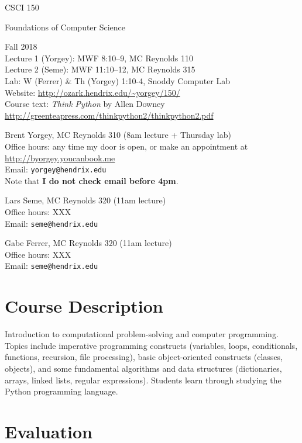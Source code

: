 \documentclass{article}
\begin{document}
{\Large
\noindent CSCI 150 \smallskip

\noindent Foundations of Computer Science \bigskip
}

\noindent Fall 2018 \\
Lecture 1 (Yorgey): MWF 8:10--9, MC Reynolds 110\\
Lecture 2 (Seme): MWF 11:10--12, MC Reynolds 315\\
Lab: W (Ferrer) \& Th (Yorgey) 1:10-4, Snoddy Computer Lab\\
Website: \url{http://ozark.hendrix.edu/~yorgey/150/} \\
Course text: \emph{Think Python} by Allen Downey \\
\indent \url{http://greenteapress.com/thinkpython2/thinkpython2.pdf}
\medskip

\noindent Brent Yorgey, MC Reynolds 310 (8am lecture + Thursday lab)\\
Office hours: any time my door is open, or make an appointment at \\
\indent \url{http://byorgey.youcanbook.me} \\
Email: \texttt{yorgey@hendrix.edu} \\
Note that \textbf{I do not check email before 4pm}.\medskip

\noindent Lars Seme, MC Reynolds 320 (11am lecture)\\
Office hours: XXX \\
Email: \texttt{seme@hendrix.edu}

\noindent Gabe Ferrer, MC Reynolds 320 (11am lecture)\\
Office hours: XXX \\
Email: \texttt{seme@hendrix.edu}


\section*{Course Description}

Introduction to computational problem-solving and computer
programming. Topics include imperative programming constructs
(variables, loops, conditionals, functions, recursion, file
processing), basic object-oriented constructs (classes, objects), and
some fundamental algorithms and data structures (dictionaries, arrays,
linked lists, regular expressions). Students learn through studying
the Python programming language.

\section*{Evaluation}
\end{document}
